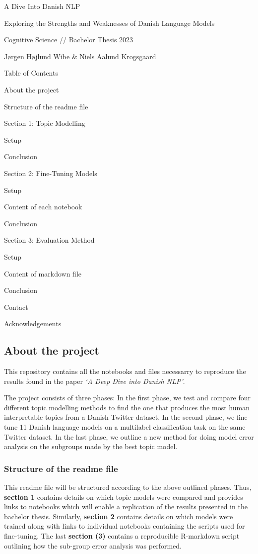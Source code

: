 \documentclass[
]{article}
\author{}
\date{\vspace{-2.5em}}
\begin{document}
A Dive Into Danish NLP

Exploring the Strengths and Weaknesses of Danish Language Models

Cognitive Science // Bachelor Thesis 2023

Jørgen Højlund Wibe \& Niels Aalund Krogsgaard

Table of Contents

About the project

Structure of the readme file

Section 1: Topic Modelling

Setup

Conclusion

Section 2: Fine-Tuning Models

Setup

Content of each notebook

Conclusion

Section 3: Evaluation Method

Setup

Content of markdown file

Conclusion

Contact

Acknowledgements

\hypertarget{about-the-project}{%
\subsection{About the project}\label{about-the-project}}

This repository contains all the notebooks and files necessarry to
reproduce the results found in the paper \emph{`A Deep Dive into Danish
NLP'}.

The project consists of three phases: In the first phase, we test and
compare four different topic modelling methods to find the one that
produces the most human interpretable topics from a Danish Twitter
dataset. In the second phase, we fine-tune 11 Danish language models on
a multilabel classification task on the same Twitter dataset. In the
last phase, we outline a new method for doing model error analysis on
the subgroups made by the best topic model.

\hypertarget{structure-of-the-readme-file}{%
\subsubsection{Structure of the readme
file}\label{structure-of-the-readme-file}}

This readme file will be structured according to the above outlined
phases. Thus, \textbf{section 1} contains details on which topic models
were compared and provides links to notebooks which will enable a
replication of the results presented in the bachelor thesis. Similarly,
\textbf{section 2} contains details on which models were trained along
with links to individual notebooks containing the scripts used for
fine-tuning. The last \textbf{section (3)} contains a reproducible
R-markdown script outlining how the sub-group error analysis was
performed.
\end{document}
